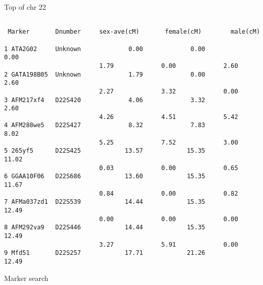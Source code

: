 \documentclass[12pt,t]{beamer}
\begin{document}
\begin{frame}[fragile]{Top of chr 22}

\begin{center}

{\fontsize{8pt}{9.5}\selectfont

\begin{verbatim}

 Marker       Dnumber     sex-ave(cM)       female(cM)        male(cM)

1 ATA2G02     Unknown             0.00             0.00             0.00
                          1.79             0.00             2.60
2 GATA198B05  Unknown             1.79             0.00             2.60
                          2.27             3.32             0.00
3 AFM217xf4   D22S420             4.06             3.32             2.60
                          4.26             4.51             5.42
4 AFM288we5   D22S427             8.32             7.83             8.02
                          5.25             7.52             3.00
5 265yf5      D22S425            13.57            15.35            11.02
                          0.03             0.00             0.65
6 GGAA10F06   D22S686            13.60            15.35            11.67
                          0.84             0.00             0.82
7 AFMa037zd1  D22S539            14.44            15.35            12.49
                          0.00             0.00             0.00
8 AFM292va9   D22S446            14.44            15.35            12.49
                          3.27             5.91             0.00
9 Mfd51       D22S257            17.71            21.26            12.49
\end{verbatim}

}
\end{center}
\end{frame}


\begin{frame}[c]{Marker search}



\end{frame}
\end{document}
